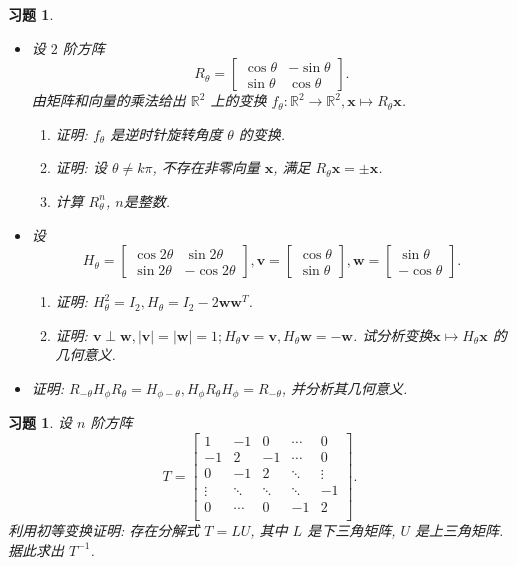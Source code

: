\documentclass[UTF8]{ctexart}
\newcommand{\bv}{{\bm v}}
\newcommand{\bw}{{\bm w}}
\newcommand{\bx}{{\bm x}}
\newtheorem{ex}[thm]{习题}
\begin{document}
\begin{ex}
	\begin{itemize}
\item[(a)] 设 $2$ 阶方阵
\[
R_{\theta}=\begin{bmatrix}
\cos\theta & -\sin\theta\\
\sin\theta & \cos\theta
\end{bmatrix}.
\]
由矩阵和向量的乘法给出 $\mathbb{R}^2$ 上的变换 $f_{\theta}:\mathbb{R}^2 \to \mathbb{R}^2, \bx \mapsto R_{\theta}\bx$.
\begin{enumerate}
\item[(1)] 证明: $f_{\theta}$ 是逆时针旋转角度 $\theta$ 的变换.
\item[(2)] 证明: 设 $\theta \ne k\pi$, 不存在非零向量 $\bx$, 满足 $R_{\theta}\bx=\pm\bx$.
\item[(3)] 计算 $R_{\theta}^n$, $n$是整数.
\end{enumerate}

\item[(b)] 设
\[
H_{\theta}=\begin{bmatrix}
\cos2\theta & \sin2\theta\\
\sin2\theta & -\cos2\theta
\end{bmatrix}, \bv=\begin{bmatrix}
\cos\theta \\
\sin\theta
\end{bmatrix}, \bw=\begin{bmatrix}
\sin\theta \\
-\cos\theta
\end{bmatrix}.
\]
\begin{enumerate}
	\item[(1)] 证明: $H_{\theta}^2=I_2, H_{\theta}=I_2-2\bw\bw^{T}$.
    \item[(2)] 证明: $\bv \perp \bw, |\bv|=|\bw|=1; H_{\theta}\bv=\bv, H_{\theta}\bw=-\bw$. 试分析变换$\bx \mapsto H_{\theta}\bx$ 的几何意义.
    \end{enumerate}
\item[(c)] 证明: $R_{-\theta}H_{\phi}R_{\theta}=H_{\phi-\theta}, H_{\phi}R_{\theta}H_{\phi}=R_{-\theta}$, 并分析其几何意义.

\end{itemize}
	\end{ex}



\begin{ex}
设 $n$ 阶方阵
$$T=\begin{bmatrix} 1 & -1 & 0 & \cdots & 0 \\ -1 & 2 & -1 & \cdots & 0 \\ 0 & -1 & 2 & \ddots & \vdots \\  \vdots & \ddots & \ddots & \ddots & -1 \\ 0 & \cdots & 0 & -1 & 2 \\ \end{bmatrix}.$$
利用初等变换证明: 存在分解式 $T=LU$, 其中 $L$ 是下三角矩阵, $U$ 是上三角矩阵. 据此求出 $T^{-1}$.
\end{ex}
\end{document}
